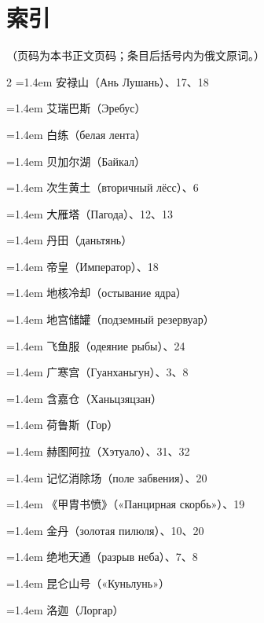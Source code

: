 \clearpage
\chapter*{索\quad 引}

\noindent
（页码为本书正文页码；条目后括号内为俄文原词。）

\vspace{4mm}
{\footnotesize
\linespread{1.30}\selectfont
\setlength{\columnsep}{16pt}
\begin{multicols}{2}
\noindent
\hangindent=1.4em 安禄山（Ань Лушань）、17、18

\hangindent=1.4em 艾瑞巴斯（Эребус）

\hangindent=1.4em 白练（белая лента）

\hangindent=1.4em 贝加尔湖（Байкал）

\hangindent=1.4em 次生黄土（вторичный лёсс）、6

\hangindent=1.4em 大雁塔（Пагода）、12、13

\hangindent=1.4em 丹田（даньтянь）

\hangindent=1.4em 帝皇（Император）、18

\hangindent=1.4em 地核冷却（остывание ядра）

\hangindent=1.4em 地宫储罐（подземный резервуар）

\hangindent=1.4em 飞鱼服（одеяние рыбы）、24

\hangindent=1.4em 广寒宫（Гуанханьгун）、3、8

\hangindent=1.4em 含嘉仓（Ханьцзяцзан）

\hangindent=1.4em 荷鲁斯（Гор）

\hangindent=1.4em 赫图阿拉（Хэтуало）、31、32

\hangindent=1.4em 记忆消除场（поле забвения）、20

\hangindent=1.4em 《甲胄书愤》（«Панцирная скорбь»）、19

\hangindent=1.4em 金丹（золотая пилюля）、10、20

\hangindent=1.4em 绝地天通（разрыв неба）、7、8

\hangindent=1.4em 昆仑山号（«Куньлунь»）

\hangindent=1.4em 洛迦（Лоргар）


\end{multicols}}
